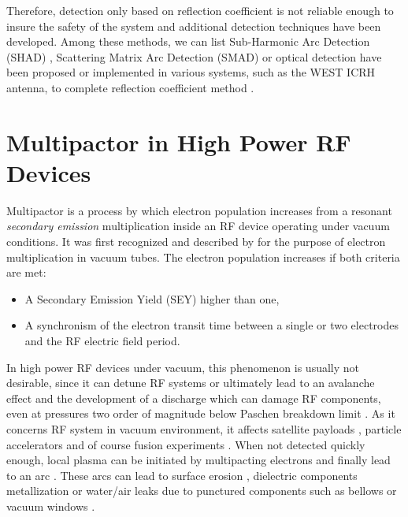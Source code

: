 Therefore, detection only based on reflection coefficient is not reliable enough to insure the safety of the system and additional detection techniques have been developed. Among these methods, we can list Sub-Harmonic Arc Detection (SHAD) , Scattering Matrix Arc Detection (SMAD)  or optical detection have been proposed or implemented in various systems, such as the WEST ICRH antenna, to complete reflection coefficient method . 



\section[Multipactor]{Multipactor in High Power RF Devices}
Multipactor is a process by which electron population increases from a resonant \textit{secondary emission} multiplication inside an RF device operating under vacuum conditions. It was first recognized and described by  for the purpose of electron multiplication in vacuum tubes. The electron population increases if both criteria are met: 
\begin{itemize}
	\item A Secondary Emission Yield (SEY) higher than one,
	\item A synchronism of the electron transit time between a single or two electrodes and the RF electric field period.
\end{itemize}

In high power RF devices under vacuum, this phenomenon is usually not desirable, since it can detune RF systems or ultimately lead to an avalanche effect and the development of a discharge which can damage RF components, even at pressures two order of magnitude below Paschen breakdown limit . As it concerns RF system in vacuum environment, it affects satellite payloads , particle accelerators  and of course fusion experiments . When not detected quickly enough, local plasma can be initiated by multipacting electrons and finally lead to an arc . These arcs can lead to surface erosion , dielectric components metallization  or water/air leaks due to punctured components such as bellows or vacuum windows . 

